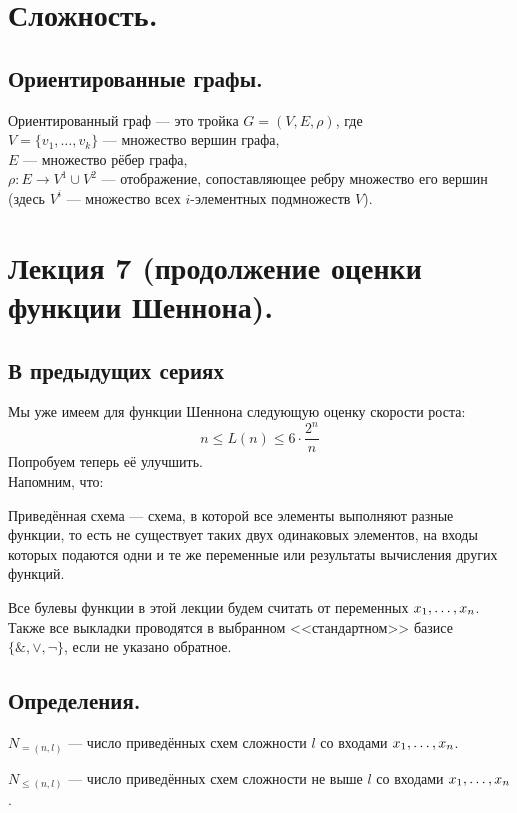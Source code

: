 
\section{Сложность.}
\subsection{Ориентированные графы.}
    \begin{df} 
        Ориентированный граф --- это тройка $G = (V, E, \rho)$, где\\
        $V = \{v_1, \dots, v_k\}$ --- множество вершин графа,\\
        $E$ --- множество рёбер графа,\\ 
        $\rho\colon E \rightarrow V^1 \cup V^2$ --- отображение, сопоставляющее ребру множество его вершин (здесь $V^i$ --- множество всех $i$-элементных подмножеств $V$).
    \end{df}

\section{Лекция 7 (продолжение оценки функции Шеннона).} 
\subsection{В предыдущих сериях}
Мы уже имеем для функции Шеннона следующую оценку скорости роста:
$$n\leq L(n)\leq 6\cdot \frac{2^n}{n}$$
Попробуем теперь её улучшить.\\
Напомним, что:
\begin{definition}
Приведённая схема --- схема, в которой все элементы выполняют разные функции, то есть не существует таких двух одинаковых элементов, на входы которых подаются одни и те же переменные или результаты вычисления других функций.
\end{definition}
Все булевы функции в этой лекции будем считать от переменных $x_1, \ldots, x_n$. Также все выкладки проводятся в выбранном <<стандартном>> базисе $\{\& ,\vee ,\neg\}$, если не указано обратное.
\subsection{Определения.}
\begin{definition}
$N_{=(n,l)}$ --- число приведённых схем сложности $l$ со входами $x_1, \ldots, x_n$.
\end{definition}
\begin{definition}
$N_{\leq(n,l)}$ --- число приведённых схем сложности не выше $l$ со входами $x_1, \ldots, x_n$.
\end{definition}
